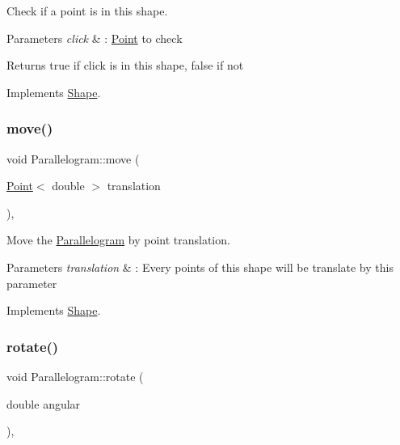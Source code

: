 Check if a point is in this shape. 


\begin{DoxyParams}{Parameters}
{\em click} & \+: \hyperlink{classPoint}{Point} to check \\
\hline
\end{DoxyParams}
\begin{DoxyReturn}{Returns}
true if click is in this shape, false if not 
\end{DoxyReturn}


Implements \hyperlink{classShape_abcce23128cd35989468a88a7194152af}{Shape}.

\mbox{\label{classParallelogram_a982287c8d16ec47951db62b07eb77feb}} 
\subsubsection{\texorpdfstring{move()}{move()}}
{\footnotesize\ttfamily void Parallelogram\+::move (\begin{DoxyParamCaption}\item[{\hyperlink{classPoint}{Point}$<$ double $>$}]{translation }\end{DoxyParamCaption})\hspace{0.3cm}{\ttfamily [override]}, {\ttfamily [virtual]}}



Move the \hyperlink{classParallelogram}{Parallelogram} by point translation. 


\begin{DoxyParams}{Parameters}
{\em translation} & \+: Every points of this shape will be translate by this parameter \\
\hline
\end{DoxyParams}


Implements \hyperlink{classShape_a52649731b2cb7b67315882d5e005f7e8}{Shape}.

\mbox{\label{classParallelogram_ac498f6a15dea236ecc49bece023d17b0}} 
\subsubsection{\texorpdfstring{rotate()}{rotate()}}
{\footnotesize\ttfamily void Parallelogram\+::rotate (\begin{DoxyParamCaption}\item[{double}]{angular }\end{DoxyParamCaption})\hspace{0.3cm}{\ttfamily [override]}, {\ttfamily [virtual]}}



